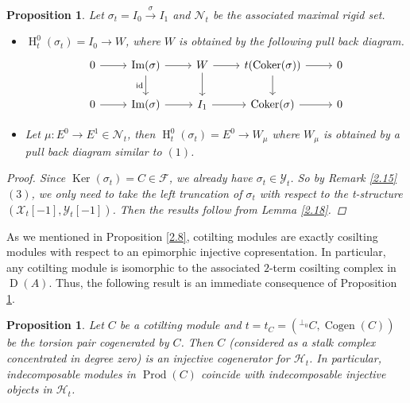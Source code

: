 \documentclass[12pt]{amsart}
\numberwithin{equation}{section}
\newtheorem{proposition}[lemma]{Proposition}
\theoremstyle{definition}
\DeclareMathOperator{\id}{id}
\DeclareMathOperator{\Ker}{Ker}
\DeclareMathOperator{\Coker}{Coker}
\DeclareMathOperator{\Cogen}{Cogen}
\DeclareMathOperator{\Imm}{Im}
\DeclareMathOperator{\D}{D}
\DeclareMathOperator{\HH}{H}
\DeclareMathOperator{\Prod}{Prod}
\newtheorem*{theorem 0*}{Theorem}
\newtheorem*{theorem a*}{Theorem A}
\newtheorem*{theorem b*}{Theorem B}
\newcounter{diagram}
\numberwithin{diagram}{section}
\begin{document}
	\begin{proposition}\label{2.22}
	Let $\sigma_t=I_0\overset{\sigma}{\rightarrow}I_1$ and $\mathcal{N}_t$ be the associated maximal rigid set.
    \begin{itemize}
    \item[(1)]
    $\HH^0_t(\sigma_t)=I_0\rightarrow W$, where $W$ is obtained by the following pull back diagram.
    \[\begin{tikzcd}
	0 & {\Imm(\sigma)} & W & {t(\Coker(\sigma))} & 0 \\
	0 & {\Imm(\sigma)} & {I_1} & {\Coker(\sigma)} & 0
	\arrow[from=1-1, to=1-2]
	\arrow[from=1-2, to=1-3]
	\arrow["\id"', from=1-2, to=2-2]
	\arrow[from=1-3, to=1-4]
	\arrow[from=1-3, to=2-3]
	\arrow[from=1-4, to=1-5]
	\arrow[from=1-4, to=2-4]
	\arrow[from=2-1, to=2-2]
	\arrow[from=2-2, to=2-3]
	\arrow[from=2-3, to=2-4]
	\arrow[from=2-4, to=2-5]
\end{tikzcd}\]
    \item[(2)]
    Let $\mu:E^0\rightarrow E^1\in\mathcal{N}_t$, then $\HH^0_t(\sigma_t)=E^0\rightarrow W_{\mu}$ where $W_{\mu}$ is obtained by a pull back diagram similar to $(1)$.
    \end{itemize}	
    \begin{proof}
    Since $\Ker(\sigma_t)=C\in \mathcal{F}$, we already have $\sigma_t\in \mathcal{Y}_t$. So by Remark \ref{2.15} $(3)$, we only need to take the left truncation of $\sigma_t$ with respect to the t-structure $(\mathcal{X}_t[-1],\mathcal{Y}_t[-1])$. Then the results follow from Lemma \ref{2.18}.
    \end{proof}
	\end{proposition}

	As we mentioned in Proposition \ref{2.8}, cotilting modules are exactly cosilting modules with respect to an epimorphic injective copresentation. In particular, any cotilting module is isomorphic to the associated $2$-term cosilting complex in $\D(A)$. Thus, the following result is an immediate consequence of Proposition \ref{2.22}.
	
	\begin{proposition}\cite{CGF}\label{2.23}
		Let $C$ be a cotilting module and $t=t_C=(^{\bot_0}C,\Cogen(C))$ be
		the torsion pair cogenerated by $C$. Then $C$ (considered as a stalk complex concentrated in degree zero) is an injective cogenerator for $\mathcal{H}_t$. In particular, indecomposable modules in $\Prod(C)$ coincide with indecomposable injective objects in $\mathcal{H}_t$.
	\end{proposition}
	
\end{document}
